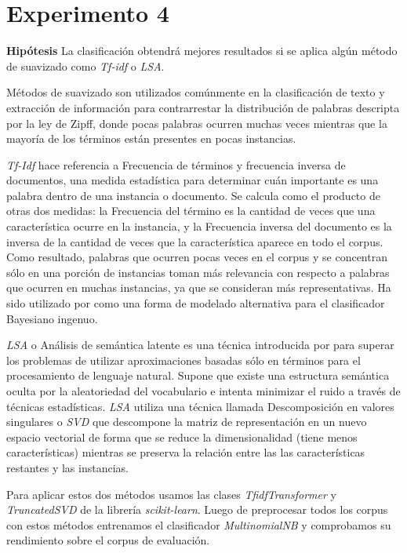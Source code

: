 \section{Experimento 4}
\vspace{3 mm}
\textbf{Hipótesis} La clasificación obtendrá mejores resultados si se aplica algún método de suavizado como \textit{Tf-idf} o \textit{LSA}.
\vspace{3 mm}

Métodos de suavizado son utilizados comúnmente en la clasificación de texto y extracción de información para contrarrestar la distribución de palabras descripta por la ley de Zipff, donde pocas palabras ocurren muchas veces mientras que la mayoría de los términos están presentes en pocas instancias.

\textit{Tf-Idf} hace referencia a Frecuencia de términos y frecuencia inversa de documentos, una medida estadística para determinar cuán importante es una palabra dentro de una instancia o documento. Se calcula como el producto de otras dos medidas: la Frecuencia del término es la cantidad de veces que una característica ocurre en la instancia, y la Frecuencia inversa del documento es la inversa de la cantidad de veces que la característica aparece en todo el corpus. Como resultado, palabras que ocurren pocas veces en el corpus y se concentran sólo en una porción de instancias toman más relevancia con respecto a palabras que ocurren en muchas instancias, ya que se consideran más representativas. Ha sido utilizado por \citet{tackling-mnb} como una forma de modelado alternativa para el clasificador Bayesiano ingenuo.

\textit{LSA} o Análisis de semántica latente es una técnica introducida por \citet{lsa} para superar los problemas de utilizar aproximaciones basadas sólo en términos para el procesamiento de lenguaje natural. Supone que existe una estructura semántica oculta por la aleatoriedad del vocabulario e intenta minimizar el ruido a través de técnicas estadísticas. \textit{LSA} utiliza una técnica llamada Descomposición en valores singulares o \textit{SVD} que descompone la matriz de representación en un nuevo espacio vectorial de forma que se reduce la dimensionalidad (tiene menos características) mientras se preserva la relación entre las las características restantes y las instancias.

Para aplicar estos dos métodos usamos las clases \textit{TfidfTransformer} y \textit{TruncatedSVD} de la librería \textit{scikit-learn}. Luego de preprocesar todos los corpus con estos métodos entrenamos el clasificador \textit{MultinomialNB} y comprobamos su rendimiento sobre el corpus de evaluación.

